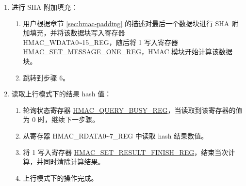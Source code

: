 \documentclass[main\_\_CN.tex]{subfiles}
\begin{document}
\begin{enumerate}
\begin{enumerate}
\begin{itemize}
\begin{enumerate}
                \end{enumerate}
                \item 如果待处理数据总位数不是 512 的倍数，有以下 3 种选项。注意，这种情况下用户应对数据进行 SHA 附加填充，且填充后待输入数据总位数应为 512 的整数倍。
                \begin{enumerate}
                    \item 如果 Block\_\textcolor{red}{n} 是唯一一个数据块，同时 Block\_\textcolor{red}{1} 已经包含了所有的填充位，则将 1 写入寄存器 \hyperref[regdesc:HMACONEBLOCKREG]{HMAC\_ONE\_BLOCK\_REG}，随后跳转到步骤 6。
                    \item 如果 Block\_\textcolor{red}{n} 是倒数第二个填充数据块，则将 1 写入寄存器\\ \hyperref[regdesc:HMACSETMESSAGEPADREG]{HMAC\_SET\_MESSAGE\_PAD\_REG}，随后跳转到步骤 5。
                    \item 如果 Block\_\textcolor{red}{n} 既不是最后一个也不是倒数第二个数据块，则将 1 写入寄存器 \\\hyperref[regdesc:HMACSETMESSAGEINGREG]{HMAC\_SET\_MESSAGE\_ING\_REG}，令$n=n+1$，随后跳转到步骤 4.(b)。
                \end{enumerate}
            \end{itemize}
        \end{enumerate}

    \item 进行 SHA 附加填充：
    \begin{enumerate}
        \item 用户根据章节 \ref{sec:hmac-padding} 的描述对最后一个数据块进行 SHA 附加填充，并将该数据块写入寄存器\\ HMAC\_WDATA0\verb+~+15\_REG，随后将 1 写入寄存器 \hyperref[regdesc:HMACSETMESSAGEONEREG]{HMAC\_SET\_MESSAGE\_ONE\_REG}，HMAC 模块开始计算该数据块。
        \item 跳转到步骤 6。
    \end{enumerate}

    \item 读取上行模式下的结果 hash 值：
    \begin{enumerate}
        \item 轮询状态寄存器 \hyperref[regdesc:HMACQUERYBUSYREG]{HMAC\_QUERY\_BUSY\_REG}，当读取到该寄存器的值为 0 时，继续下一步骤。
        \item 从寄存器 HMAC\_RDATA0\verb+~+7\_REG 中读取 hash 结果数值。
        \item 将 1 写入寄存器 \hyperref[regdesc:HMACSETRESULTFINISHREG]{HMAC\_SET\_RESULT\_FINISH\_REG}，结束当次计算，并同时清除计算结果。
        \item 上行模式下的操作完成。
    \end{enumerate}

\end{enumerate}
\end{document}
